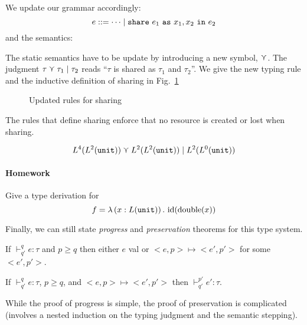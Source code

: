 \documentclass[ manuscript,screen, nonacm]{acmart}
\begin{document}
We update our grammar accordingly:
\[
e ::= \dots \mid \mathtt{share}~e_1~\mathtt{as}~x_1,x_2~\mathtt{in}~e_2
\]
and the semantics:

The static semantics have to be update by introducing a new symbol, \(\curlyvee\).
The judgment \(\tau\curlyvee\tau_1\mid\tau_2\) reads ``\(\tau\) is shared as \(\tau_1\) and
\(\tau_2\)''.
We give the new typing rule and the inductive definition of sharing in
Fig.~\ref{fig:sharing}

\begin{figure}
    \caption{Updated rules for sharing}
    \label{fig:sharing}
\end{figure}

The rules that define sharing enforce that no resource is created or lost when sharing.
\begin{example}
  \[
  L^4(L^2(\mathtt{unit}))\curlyvee L^2(L^2(\mathtt{unit}))\mid L^2(L^0(\mathtt{unit}))
  \]
\end{example}

\paragraph{Homework} Give a type derivation for
\[
  f = \lambda\left(x:L(\mathtt{unit})\right).~\mathrm{id}(\mathrm{double}(x))
\]

Finally, we can still state \emph{progress} and \emph{preservation} theorems for this type system.
\begin{theorem}[Progress]If $\vdash^q_{q'} e:\tau$ and $p\geq q$ then either $e$ val or $<e, p> \mapsto <e', p'>$ for some $<e', p'>$.
\end{theorem}

\begin{theorem}[Preservation] 
If $\vdash^q_{q'} e:\tau$, $p \geq q$, and $<e,p>\mapsto <e', p'>$ then $\vdash^{p'}_{q'} e':\tau$.
\end{theorem}

While the proof of progress is simple, the proof of preservation is complicated (involves a nested induction on the typing judgment and the semantic stepping).
\end{document}
